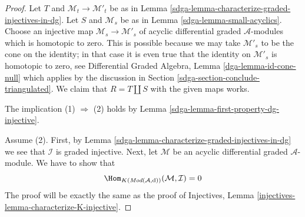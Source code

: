 \begin{proof}

Let $T$ and $\mathcal{M}_t \to \mathcal{M}'_t$ be as in
Lemma \ref{sdga-lemma-characterize-graded-injectives-in-dg}.
Let $S$ and $\mathcal{M}_s$ be as in
Lemma \ref{sdga-lemma-small-acyclics}.
Choose an injective map $\mathcal{M}_s \to \mathcal{M}'_s$
of acyclic differential graded $\mathcal{A}$-modules
which is homotopic to zero. This is possible because we
may take $\mathcal{M}'_s$ to be the cone on the identity;
in that case it is even true that the identity on
$\mathcal{M}'_s$ is homotopic to zero, see
Differential Graded Algebra, Lemma \ref{dga-lemma-id-cone-null} which
applies by the discussion in Section \ref{sdga-section-conclude-triangulated}.
We claim that $R = T \coprod S$ with the given maps works.

\medskip\noindent
The implication (1) $\Rightarrow$ (2) holds by
Lemma \ref{sdga-lemma-first-property-dg-injective}.

\medskip\noindent
Assume (2). First, by Lemma \ref{sdga-lemma-characterize-graded-injectives-in-dg}
we see that $\mathcal{I}$ is graded injective. Next, let
$\mathcal{M}$ be an acyclic differential graded $\mathcal{A}$-module.
We have to show that
$$
\Hom_{K(\textit{Mod}(\mathcal{A}, \text{d}))}(\mathcal{M}, \mathcal{I}) = 0
$$
The proof will be exactly the same as the proof of
Injectives, Lemma \ref{injectives-lemma-characterize-K-injective}.


\end{proof}
